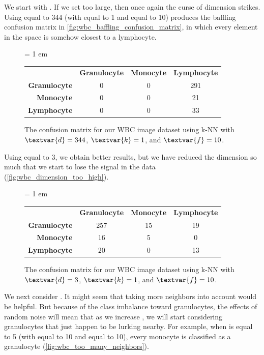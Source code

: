 We start with . If we set  too large, then once again the curse of dimension strikes. Using  equal to 344 (with  equal to 1 and  equal to 10) produces the baffling confusion matrix in \autoref{fig:wbc_baffling_confusion_matrix}, in which every element in the space is somehow closest to a lymphocyte.\\

\begin{figure}[h]
\centering
\tabcolsep = 1 em
\mySfFamily
\begin{tabular}{r c c c}
\rowcolor{gray!50}
& \textbf{Granulocyte} & \textbf{Monocyte} & \textbf{Lymphocyte} \\
\textbf{Granulocyte} & 0 & 0 & 291 \\
\textbf{Monocyte} & 0 & 0 & \phantom{5}21 \\
\textbf{Lymphocyte} & 0 & 0 & \phantom{5}33
\end{tabular}
\caption{The confusion matrix for our WBC image dataset using k-NN with $\textvar{d} = \text{344}$, $\textvar{k} = \text{1}$, and $\textvar{f} = \text{10}$.}
\label{fig:wbc_baffling_confusion_matrix}
\end{figure}

Using  equal to 3, we obtain better results, but we have reduced the dimension so much that we start to lose the signal in the data (\autoref{fig:wbc_dimension_too_high}).\\

\begin{figure}[h]
\centering
\tabcolsep = 1 em
\mySfFamily
{}
\begin{tabular}{r c c c}
\rowcolor{gray!50}
& \textbf{Granulocyte} & \textbf{Monocyte} & \textbf{Lymphocyte} \\
\textbf{Granulocyte} & 257 & 15 & 19 \\
\textbf{Monocyte} & \phantom{5}16 & \phantom{5}5 & \phantom{5}0 \\
\textbf{Lymphocyte} & \phantom{5}20 & \phantom{5}0 & 13
\end{tabular}
\caption{The confusion matrix for our WBC image dataset using k-NN with $\textvar{d} = \text{3}$, $\textvar{k} = \text{1}$, and $\textvar{f} = \text{10}$.}
\label{fig:wbc_dimension_too_high}
\end{figure}

We next consider . It might seem that taking more neighbors into account would be helpful. But because of the class imbalance toward granulocytes, the effects of random noise will mean that as we increase , we will start considering granulocytes that just happen to be lurking nearby. For example, when  is equal to 5 (with  equal to 10 and  equal to 10), every monocyte is classified as a granulocyte (\autoref{fig:wbc_too_many_neighbors}).\\



